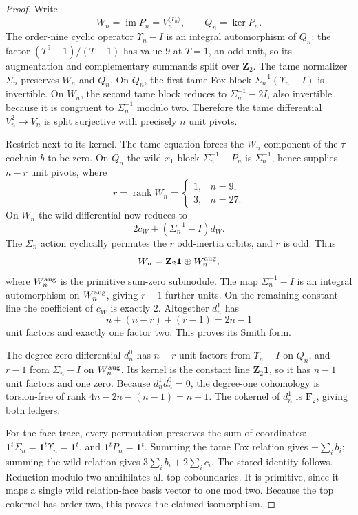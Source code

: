 \begin{proof}
Write
\[
W_n=\operatorname{im}P_n
=V_n^{\langle\Upsilon_n\rangle},
\qquad
Q_n=\ker P_n.
\]
The order-nine
cyclic operator
$\Upsilon_n-I$
is an integral
automorphism of
$Q_n$:
the factor
$(T^9-1)/(T-1)$
has value $9$
at $T=1$,
an odd unit,
so its
augmentation
and complementary
summands split
over $\mathbf Z_2$.
The tame normalizer
$\Sigma_n$ preserves
$W_n$ and $Q_n$.
On $Q_n$, the
first tame Fox
block
$\Sigma_n^{-1}(\Upsilon_n-I)$
is invertible.
On $W_n$, the
second tame block
reduces to
$\Sigma_n^{-1}-2I$,
also invertible
because it is
congruent to
$\Sigma_n^{-1}$
modulo two.
Therefore the
tame differential
$V_n^2\to V_n$
is split surjective
with precisely $n$
unit pivots.

Restrict next to
its kernel.
The tame equation
forces the
$W_n$ component
of the $\tau$
cochain $b$ to be
zero.
On $Q_n$ the
wild $x_1$ block
$\Sigma_n^{-1}-P_n$
is $\Sigma_n^{-1}$,
hence supplies
$n-r$ unit
pivots, where
\[
r=\operatorname{rank}W_n
=\begin{cases}
1,&n=9,\\
3,&n=27.
\end{cases}
\]
On $W_n$ the
wild differential
now reduces to
\[
2c_W+
(\Sigma_n^{-1}-I)d_W.
\]
The $\Sigma_n$
action cyclically
permutes the
$r$ odd-inertia
orbits, and
$r$ is odd.
Thus
\[
W_n=\mathbf Z_2\mathbf1
\oplus W_n^{\rm aug},
\]
where
$W_n^{\rm aug}$
is the primitive
sum-zero
submodule.
The map
$\Sigma_n^{-1}-I$
is an integral
automorphism on
$W_n^{\rm aug}$,
giving $r-1$
further units.
On the remaining
constant line the
coefficient of
$c_W$ is exactly
$2$.
Altogether
$d_n^1$ has
\[
n+(n-r)+(r-1)=2n-1
\]
unit factors
and exactly
one factor two.
This proves its
Smith form.

The degree-zero
differential
$d_n^0$ has
$n-r$ unit
factors from
$\Upsilon_n-I$
on $Q_n$, and
$r-1$ from
$\Sigma_n-I$
on $W_n^{\rm aug}$.
Its kernel is
the constant
line
$\mathbf Z_2\mathbf1$,
so it has
$n-1$ unit factors
and one zero.
Because
$d_n^1d_n^0=0$,
the degree-one
cohomology is
torsion-free of
rank
$4n-2n-(n-1)
=n+1$.
The cokernel
of $d_n^1$
is $\mathbf F_2$,
giving both ledgers.

For the face trace,
every permutation
preserves the
sum of coordinates:
$\mathbf1^t\Sigma_n=
\mathbf1^t\Upsilon_n=
\mathbf1^t$,
and
$\mathbf1^tP_n=\mathbf1^t$.
Summing the tame
Fox relation gives
$-\sum_i b_i$;
summing the wild
relation gives
$3\sum_i b_i+
2\sum_i c_i$.
The stated
identity follows.
Reduction modulo
two annihilates
all top coboundaries.
It is primitive,
since it maps a
single wild
relation-face
basis vector to
one mod two.
Because the
top cokernel
has order two,
this proves
the claimed
isomorphism.
\end{proof}

